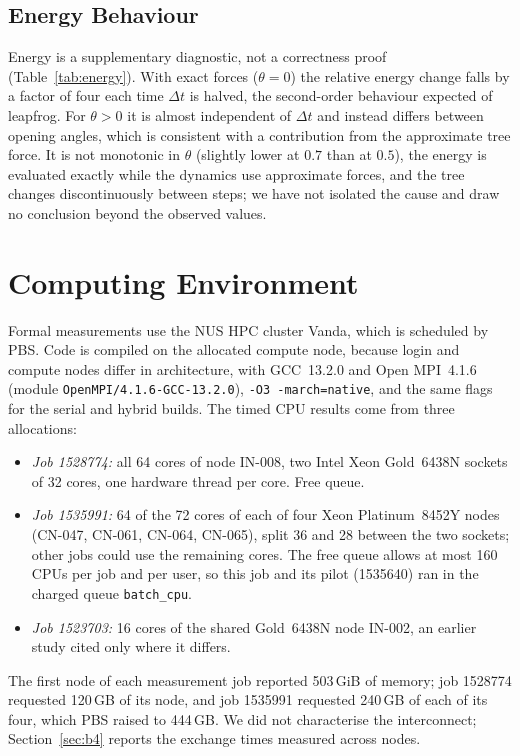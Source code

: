 \documentclass[10pt,a4paper,twocolumn,twoside]{rho-class/rho}
\begin{document}
\subsection{Energy Behaviour}
Energy is a supplementary diagnostic, not a correctness proof (Table~\ref{tab:energy}). With exact forces ($\theta=0$) the relative energy change falls by a factor of four each time $\Delta t$ is halved, the second-order behaviour expected of leapfrog. For $\theta>0$ it is almost independent of $\Delta t$ and instead differs between opening angles, which is consistent with a contribution from the approximate tree force. It is not monotonic in $\theta$ (slightly lower at $0.7$ than at $0.5$), the energy is evaluated exactly while the dynamics use approximate forces, and the tree changes discontinuously between steps; we have not isolated the cause and draw no conclusion beyond the observed values.



\section{Computing Environment}
\label{sec:environment}
Formal measurements use the NUS HPC cluster Vanda, which is scheduled by PBS. Code is compiled on the allocated compute node, because login and compute nodes differ in architecture, with GCC~13.2.0 and Open MPI~4.1.6 (module \texttt{OpenMPI/4.1.6-GCC-13.2.0}), \texttt{-O3 -march=native}, and the same flags for the serial and hybrid builds. The timed CPU results come from three allocations:
\begin{itemize}[noitemsep]
\item \emph{Job 1528774:} all 64 cores of node IN-008, two Intel Xeon Gold~6438N sockets of 32 cores, one hardware thread per core. Free queue.
\item \emph{Job 1535991:} 64 of the 72 cores of each of four Xeon Platinum~8452Y nodes (CN-047, CN-061, CN-064, CN-065), split 36 and 28 between the two sockets; other jobs could use the remaining cores. The free queue allows at most 160 CPUs per job and per user, so this job and its pilot (1535640) ran in the charged queue \texttt{batch\_cpu}.
\item \emph{Job 1523703:} 16 cores of the shared Gold~6438N node IN-002, an earlier study cited only where it differs.
\end{itemize}
The first node of each measurement job reported 503\,GiB of memory; job 1528774 requested 120\,GB of its node, and job 1535991 requested 240\,GB of each of its four, which PBS raised to 444\,GB. We did not characterise the interconnect; Section~\ref{sec:b4} reports the exchange times measured across nodes.
\end{document}
